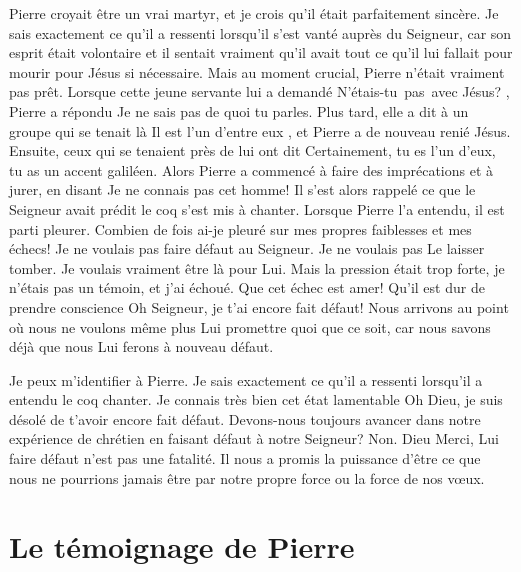 Pierre croyait être un vrai martyr,
 et je crois qu'il était parfaitement sincère.
 Je sais exactement ce qu'il a ressenti lorsqu'il s'est vanté
 auprès du Seigneur, car son esprit était volontaire et il sentait
 vraiment qu'il avait tout ce qu'il lui fallait pour mourir pour Jésus
 si nécessaire. Mais au moment crucial, Pierre n'était vraiment pas prêt.
 Lorsque cette jeune servante lui a demandé\frcolon{}
 \Og N'étais-tu~pas~avec Jésus? \Fg{}, Pierre a répondu\frcolon{}
 \Og Je ne sais pas de quoi tu parles. \Fg{}
 Plus tard, elle a dit à un groupe qui se tenait là\frcolon{}
 \Og Il est l'un d'entre eux \Fg{}, et Pierre a de nouveau renié Jésus.
 Ensuite, ceux qui se tenaient près de lui ont dit\frcolon{}
 \Og Certainement, tu es l'un d'eux, tu as un accent galiléen. \Fg{}
 Alors Pierre a commencé à faire des imprécations et à jurer, en disant\frcolon{}
 \Og Je ne connais pas cet homme! \Fg{}
 Il s'est alors rappelé ce que le Seigneur avait prédit\frcolon{}
 le coq s'est mis à chanter.
 Lorsque Pierre l'a entendu, il est parti pleurer.
 Combien de fois ai-je pleuré sur mes propres faiblesses
 et mes échecs! Je ne voulais pas faire défaut au Seigneur.
 Je ne voulais pas Le laisser tomber. Je voulais vraiment être là pour Lui.
 Mais la pression était trop forte, je n'étais pas un témoin,
 et j'ai échoué. Que cet échec est amer!
 Qu'il est dur de prendre conscience\frcolon{}
 \Og Oh Seigneur, je t'ai encore fait défaut! \Fg{}
 Nous arrivons au point où nous ne voulons même plus Lui promettre quoi
 que ce soit, car nous savons déjà que nous Lui ferons à nouveau défaut.

Je peux m'identifier à Pierre.
 Je sais exactement ce qu'il a ressenti lorsqu'il a entendu le coq chanter.
 Je connais très bien cet état lamentable\frcolon{}
 \Og Oh Dieu, je suis désolé de t'avoir encore fait défaut. \Fg{}
 Devons-nous toujours avancer dans notre expérience de chrétien
 en faisant défaut à notre Seigneur? Non.
 Dieu Merci, Lui faire défaut n'est pas une fatalité.
 Il nous a promis la puissance d'être ce que nous ne pourrions
 jamais être par notre propre force ou la force de nos vœux.


\section{Le t\'emoignage de Pierre}


